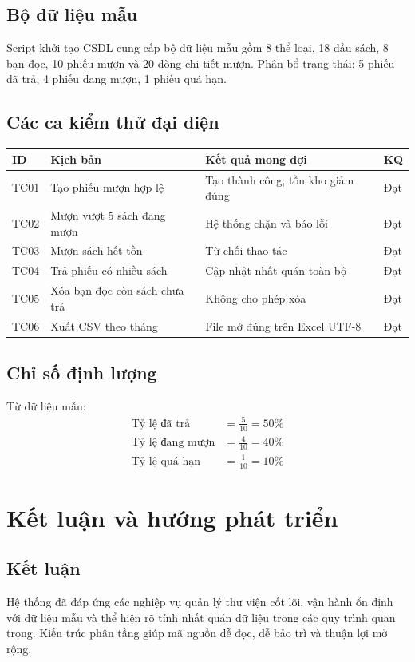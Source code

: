 \documentclass[12pt,a4paper]{article}
\begin{document}
\subsection{Bộ dữ liệu mẫu}
Script khởi tạo CSDL cung cấp bộ dữ liệu mẫu gồm 8 thể loại, 18 đầu sách, 8 bạn đọc, 10 phiếu mượn và 20 dòng chi tiết mượn. Phân bổ trạng thái: 5 phiếu đã trả, 4 phiếu đang mượn, 1 phiếu quá hạn.

\subsection{Các ca kiểm thử đại diện}
\begin{longtable}{p{1.2cm}p{6.0cm}p{5.4cm}p{2.0cm}}
\toprule
\textbf{ID} & \textbf{Kịch bản} & \textbf{Kết quả mong đợi} & \textbf{KQ} \\
\midrule
\endhead
TC01 & Tạo phiếu mượn hợp lệ & Tạo thành công, tồn kho giảm đúng & Đạt \\
TC02 & Mượn vượt 5 sách đang mượn & Hệ thống chặn và báo lỗi & Đạt \\
TC03 & Mượn sách hết tồn & Từ chối thao tác & Đạt \\
TC04 & Trả phiếu có nhiều sách & Cập nhật nhất quán toàn bộ & Đạt \\
TC05 & Xóa bạn đọc còn sách chưa trả & Không cho phép xóa & Đạt \\
TC06 & Xuất CSV theo tháng & File mở đúng trên Excel UTF-8 & Đạt \\
\bottomrule
\end{longtable}

\subsection{Chỉ số định lượng}
Từ dữ liệu mẫu:
\begin{align}
    \text{Tỷ lệ đã trả} &= \frac{5}{10} = 50\% \\
    \text{Tỷ lệ đang mượn} &= \frac{4}{10} = 40\% \\
    \text{Tỷ lệ quá hạn} &= \frac{1}{10} = 10\%
\end{align}

\section{Kết luận và hướng phát triển}
\subsection{Kết luận}
Hệ thống đã đáp ứng các nghiệp vụ quản lý thư viện cốt lõi, vận hành ổn định với dữ liệu mẫu và thể hiện rõ tính nhất quán dữ liệu trong các quy trình quan trọng. Kiến trúc phân tầng giúp mã nguồn dễ đọc, dễ bảo trì và thuận lợi mở rộng.
\end{document}
